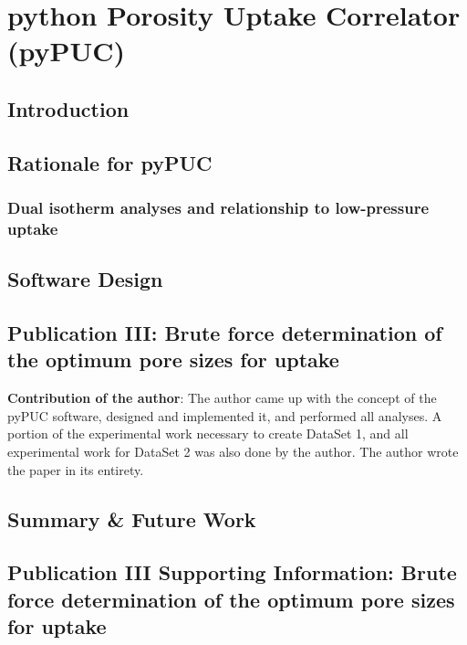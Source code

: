 \chapter{python Porosity Uptake Correlator (pyPUC)}
\label{ch:pyPUC}

\section{Introduction}

\section{Rationale for pyPUC}
\subsection{Dual isotherm analyses and relationship to low-pressure  uptake}

\section{Software Design}

\newpage
\section[Publication III]{Publication III: Brute force determination of the optimum pore sizes for
 uptake}

\textbf{Contribution of the author}: The author came up with the concept of the pyPUC software, designed and implemented it, and performed all analyses. A portion of the experimental work necessary to create DataSet 1, and all experimental work for DataSet 2 was also done by the author. The author wrote the paper in its entirety.

\newpage

\setlength{\originalVOffset}{\voffset}   
\setlength{\originalHOffset}{\hoffset}

\setlength{\voffset}{0cm}
\setlength{\hoffset}{0cm}

\setlength{\voffset}{\originalVOffset}
\setlength{\hoffset}{\originalHOffset}

\section{Summary \& Future Work}

\newpage
\section[Publication III Supporting Information]{Publication III Supporting Information: Brute force determination of the optimum pore sizes for  uptake}

